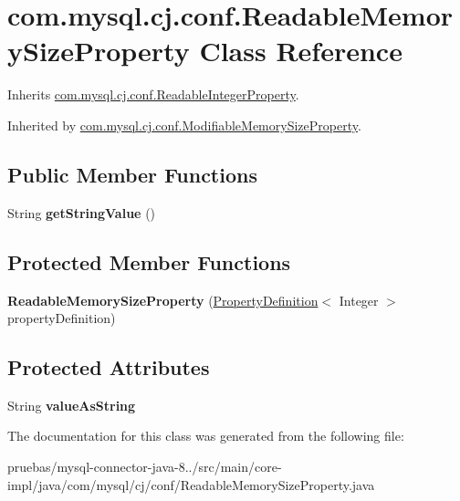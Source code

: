 \hypertarget{classcom_1_1mysql_1_1cj_1_1conf_1_1_readable_memory_size_property}{}\section{com.\+mysql.\+cj.\+conf.\+Readable\+Memory\+Size\+Property Class Reference}
\label{classcom_1_1mysql_1_1cj_1_1conf_1_1_readable_memory_size_property}


Inherits \mbox{\hyperlink{classcom_1_1mysql_1_1cj_1_1conf_1_1_readable_integer_property}{com.\+mysql.\+cj.\+conf.\+Readable\+Integer\+Property}}.



Inherited by \mbox{\hyperlink{classcom_1_1mysql_1_1cj_1_1conf_1_1_modifiable_memory_size_property}{com.\+mysql.\+cj.\+conf.\+Modifiable\+Memory\+Size\+Property}}.

\subsection*{Public Member Functions}
\begin{DoxyCompactItemize}
\item 
\mbox{\label{classcom_1_1mysql_1_1cj_1_1conf_1_1_readable_memory_size_property_aa567293de20349f813addf59c7ecfbad}} 
String {\bfseries get\+String\+Value} ()
\end{DoxyCompactItemize}
\subsection*{Protected Member Functions}
\begin{DoxyCompactItemize}
\item 
\mbox{\label{classcom_1_1mysql_1_1cj_1_1conf_1_1_readable_memory_size_property_ac747858d1690da8c523be70b26d571a2}} 
{\bfseries Readable\+Memory\+Size\+Property} (\mbox{\hyperlink{interfacecom_1_1mysql_1_1cj_1_1conf_1_1_property_definition}{Property\+Definition}}$<$ Integer $>$ property\+Definition)
\end{DoxyCompactItemize}
\subsection*{Protected Attributes}
\begin{DoxyCompactItemize}
\item 
\mbox{\label{classcom_1_1mysql_1_1cj_1_1conf_1_1_readable_memory_size_property_a8a60af4f9a466b59aca2f18f55d6a096}} 
String {\bfseries value\+As\+String}
\end{DoxyCompactItemize}


The documentation for this class was generated from the following file\+:\begin{DoxyCompactItemize}
\item 
pruebas/mysql-\/connector-\/java-\/8../src/main/core-\/impl/java/com/mysql/cj/conf/Readable\+Memory\+Size\+Property.\+java\end{DoxyCompactItemize}
